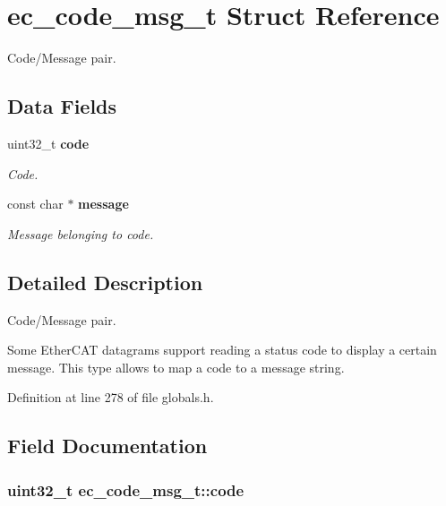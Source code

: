 \section{ec\-\_\-code\-\_\-msg\-\_\-t \-Struct \-Reference}
\label{structec__code__msg__t}


\-Code/\-Message pair.  


\subsection*{\-Data \-Fields}
\begin{DoxyCompactItemize}
\item 
uint32\-\_\-t {\bf code}
\begin{DoxyCompactList}\small\item\em \-Code. \end{DoxyCompactList}\item 
const char $\ast$ {\bf message}
\begin{DoxyCompactList}\small\item\em \-Message belonging to {\itshape code\/}. \end{DoxyCompactList}\end{DoxyCompactItemize}


\subsection{\-Detailed \-Description}
\-Code/\-Message pair. 

\-Some \-Ether\-C\-A\-T datagrams support reading a status code to display a certain message. \-This type allows to map a code to a message string. 

\-Definition at line 278 of file globals.\-h.



\subsection{\-Field \-Documentation}
\subsubsection[{code}]{\setlength{\rightskip}{0pt plus 5cm}uint32\-\_\-t {\bf ec\-\_\-code\-\_\-msg\-\_\-t\-::code}}\label{structec__code__msg__t_a21dd735111c4e487365bf7570fda697d}


